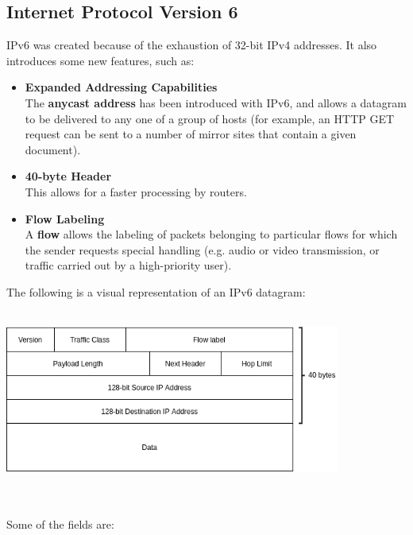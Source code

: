 \documentclass{article}
\begin{document}
\subsection{Internet Protocol Version 6}
IPv6 was created because of the exhaustion of 32-bit IPv4 addresses. It also introduces some new features, such as:

\begin{itemize}
	\item \textbf{Expanded Addressing Capabilities}
	\vspace{.2cm} \\
	The \textbf{anycast address} has been introduced with IPv6, and allows a datagram to be delivered to any one of a group of hosts (for example, an HTTP GET request can be sent to a number of mirror sites that contain a given document).
	
	\item \textbf{40-byte Header}
	\vspace{.2cm} \\
	This allows for a faster processing by routers.
	
	\item \textbf{Flow Labeling}
	\vspace{.2cm} \\
	A \textbf{flow} allows the labeling of packets belonging to particular flows for which the sender requests special handling (e.g. audio or video transmission, or traffic carried out by a high-priority user).
\end{itemize}
The following is a visual representation of an IPv6 datagram: \\ \\
\centerline{\includegraphics[width=11cm]{./assets/ipv6.png}} \\ \\ 
Some of the fields are:
\end{document}
